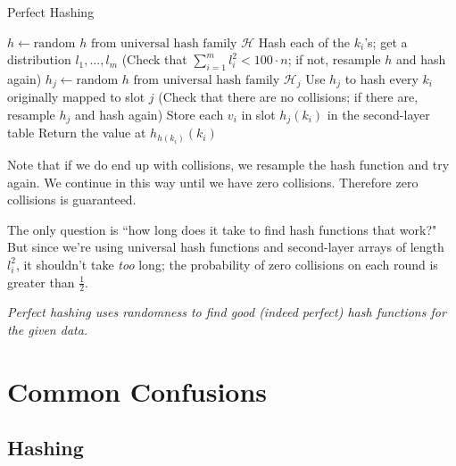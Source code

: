 \documentclass[11pt]{article}
\begin{document}
{\begin{algorithm}
\caption{Perfect Hashing}
\begin{algorithmic}[1]
\State $h \gets \text{random $h$ from universal hash family $\mathcal{H}$}$
\State Hash each of the $k_i$'s; get a distribution $l_1, ..., l_m$
\State \indent (Check that $\sum_{i = 1}^m l_i^2 < 100 \cdot n$; if not, resample $h$ and hash again)
  \State $h_j \gets \text{random $h$ from universal hash family $\mathcal{H}_j$}$
  \State Use $h_j$ to hash every $k_i$ originally mapped to slot $j$
  \State \indent (Check that there are no collisions; if there are, resample $h_j$ and hash again)
  \State Store each $v_i$ in slot $h_j(k_i)$ in the second-layer table
\EndFor
\EndProcedure
{}
\State Return the value at $h_{h(k_i)}(k_i)$
\EndProcedure
\end{algorithmic}
\end{algorithm}

Note that if we do end up with collisions, we resample the hash function and try again. We continue in this way until we have zero collisions. Therefore zero collisions is guaranteed.

The only question is ``how long does it take to find hash functions that work?" But since we're using universal hash functions and second-layer arrays of length $l_i^2$, it shouldn't take \textit{too} long; the probability of zero collisions on each round is greater than $\frac{1}{2}$.

\textit{Perfect hashing uses randomness to find good (indeed perfect) hash functions for the given data.}
}

\section*{Common Confusions}

\subsection*{Hashing}
\end{document}
